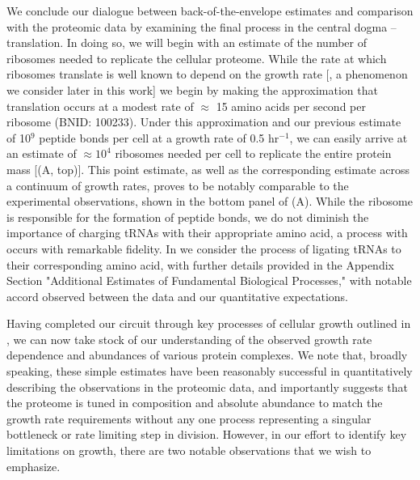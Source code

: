 We conclude our dialogue between back-of-the-envelope estimates and
comparison with the proteomic data by examining the final process in the
central dogma -- translation. In doing so, we will begin with an estimate of
the number of ribosomes needed to replicate the cellular proteome. While the
rate at which ribosomes translate is well known to depend on the growth
rate [\cite{dai2018}, a phenomenon we consider later in this work] we begin by making
the approximation that translation occurs at a modest rate of $\approx$ 15
amino acids per second per ribosome (BNID: 100233). Under this approximation
and our previous estimate of 10$^{9}$ peptide bonds per cell at a growth rate
of 0.5 hr$^{-1}$, we can easily arrive at an estimate of $\approx 10^4$
ribosomes needed per cell to replicate the entire protein mass
[(A, top)]. This point estimate, as well as the
corresponding estimate across a continuum of growth rates, proves to be
notably comparable to the experimental observations, shown in the bottom
panel of (A). While the ribosome is responsible for
the formation of peptide bonds, we do not diminish the importance of charging
tRNAs with their appropriate amino acid, a process with occurs with
remarkable fidelity. In  we consider the process of ligating tRNAs
to their corresponding amino acid, with further details provided in the Appendix Section "Additional Estimates of Fundamental Biological Processes," with notable accord observed between the
data and our quantitative expectations.

Having completed our circuit through key processes of cellular growth
outlined in , we can now take stock of our understanding of the
observed growth rate dependence and abundances of various protein complexes. We
note that, broadly speaking, these simple estimates have been reasonably successful in
quantitatively describing the observations in the proteomic data, and importantly suggests
that the proteome is tuned in composition and absolute abundance to match the
growth rate requirements without any one process representing a singular
bottleneck or rate limiting step in division. However, in our effort to identify
key limitations on growth, there are two notable observations that we
wish to emphasize.

